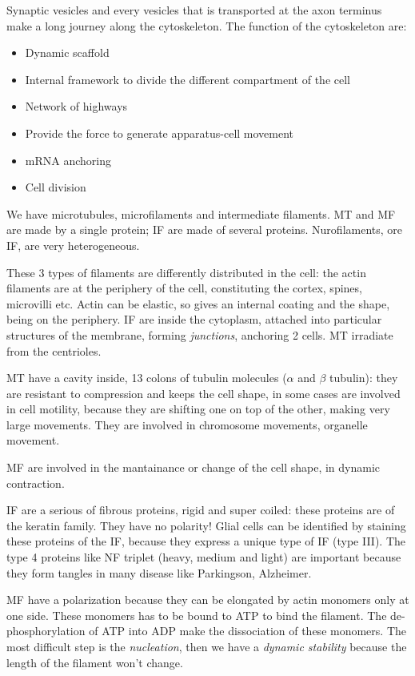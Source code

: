 \documentclass[a4paper, 12pt]{book}
\begin{document}
Synaptic vesicles and every vesicles that is transported at the axon terminus make a long journey along the cytoskeleton. 
 The function of the cytoskeleton are:
 \begin{itemize}
 \item{Dynamic  scaffold}
 \item{Internal framework to divide the different compartment of the cell}
 \item{Network of highways}
  \item{Provide the force to generate apparatus-cell movement}
 \item{mRNA anchoring}
 \item{Cell division}
\end{itemize}
 We have microtubules, microfilaments and intermediate filaments. MT and MF are made by a single protein; IF are made of several proteins.
 Nurofilaments, ore IF, are very heterogeneous. 
 
 These 3 types of filaments are differently distributed in the cell: the actin filaments are at the periphery of the cell, constituting the cortex, spines, microvilli etc. Actin can be elastic, so gives an internal coating and the shape, being on the periphery.  IF are inside the cytoplasm, attached into particular structures of the membrane, forming \emph{junctions}, anchoring 2 cells. MT irradiate from the centrioles.
 
 MT have a cavity inside, 13 colons of tubulin molecules ($\alpha$ and $\beta$ tubulin): they are resistant to compression and keeps the cell shape, in some cases are involved in cell motility, because they are shifting one on top of the other, making very large movements. They are involved in chromosome movements, organelle movement.
 
 MF are involved in the mantainance or change of the cell shape, in dynamic contraction.
 
 IF are a serious of fibrous proteins, rigid and super coiled: these proteins are of the keratin family. They have no polarity! Glial cells can be identified by staining these proteins of the IF, because they express a unique type of IF (type III). The type 4 proteins like NF triplet (heavy, medium and light) are important because they form tangles in many disease like Parkingson, Alzheimer.
 
MF have a polarization because they can be elongated by actin monomers only at one side. These monomers has to be bound to ATP to bind the filament. The de-phosphorylation of ATP into ADP make the dissociation of these monomers. The most difficult step is the \emph{nucleation}, then we have a \emph{dynamic stability} because the length of the filament won't change.
\end{document}
